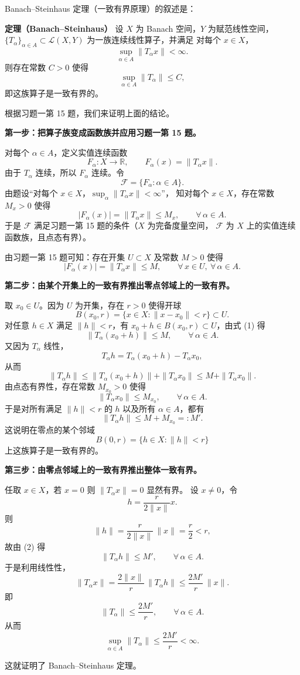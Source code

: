 \begin{solution}
Banach--Steinhaus 定理（一致有界原理）的叙述是：

\medskip
\noindent
\textbf{定理（Banach--Steinhaus）}\;
设 $X$ 为 Banach 空间，$Y$ 为赋范线性空间，
$\{T_\alpha\}_{\alpha\in A}\subset \mathcal{L}(X,Y)$ 为一族连续线性算子，并满足
对每个 $x\in X$，
\[
\sup_{\alpha\in A}\|T_\alpha x\|<\infty.
\]
则存在常数 $C>0$ 使得
\[
\sup_{\alpha\in A}\|T_\alpha\|\le C,
\]
即这族算子是一致有界的。

\medskip

根据习题一第 15 题，我们来证明上面的结论。

\medskip
\noindent
\textbf{第一步：把算子族变成函数族并应用习题一第 15 题。}

对每个 $\alpha\in A$，定义实值连续函数
\[
F_\alpha:X\to \mathbb{R},\qquad F_\alpha(x)=\|T_\alpha x\|.
\]
由于 $T_\alpha$ 连续，所以 $F_\alpha$ 连续。令
\[
\mathcal{F}=\{F_\alpha:\alpha\in A\}.
\]
由题设“对每个 $x\in X$，$\sup_{\alpha}\|T_\alpha x\|<\infty$”，
知对每个 $x\in X$，存在常数 $M_x>0$ 使得
\[
|F_\alpha(x)|=\|T_\alpha x\|\le M_x,\qquad \forall\,\alpha\in A.
\]
于是 $\mathcal{F}$ 满足习题一第 15 题的条件（$X$ 为完备度量空间，
$\mathcal{F}$ 为 $X$ 上的实值连续函数族，且点态有界）。

由习题一第 15 题可知：存在开集 $U\subset X$ 及常数 $M>0$ 使得
\[
|F_\alpha(x)|=\|T_\alpha x\|\le M,\qquad \forall\,x\in U,\ \forall\,\alpha\in A. \tag{1}
\]

\medskip
\noindent
\textbf{第二步：由某个开集上的一致有界推出零点邻域上的一致有界。}

取 $x_0\in U$。因为 $U$ 为开集，存在 $r>0$ 使得开球
\[
B(x_0,r)=\{x\in X:\|x-x_0\|<r\}\subset U.
\]
对任意 $h\in X$ 满足 $\|h\|<r$，有 $x_0+h\in B(x_0,r)\subset U$，由式 (1) 得
\[
\|T_\alpha(x_0+h)\|\le M,\qquad \forall\,\alpha\in A.
\]
又因为 $T_\alpha$ 线性，
\[
T_\alpha h = T_\alpha(x_0+h)-T_\alpha x_0,
\]
从而
\[
\|T_\alpha h\|
\le \|T_\alpha(x_0+h)\|+\|T_\alpha x_0\|
\le M + \|T_\alpha x_0\|.
\]
由点态有界性，存在常数 $M_{x_0}>0$ 使得
\[
\|T_\alpha x_0\|\le M_{x_0},\qquad \forall\,\alpha\in A.
\]
于是对所有满足 $\|h\|<r$ 的 $h$ 以及所有 $\alpha\in A$，都有
\[
\|T_\alpha h\|\le M+M_{x_0}=:M'. \tag{2}
\]
这说明在零点的某个邻域
\[
B(0,r)=\{h\in X:\|h\|<r\}
\]
上这族算子是一致有界的。

\medskip
\noindent
\textbf{第三步：由零点邻域上的一致有界推出整体一致有界。}

任取 $x\in X$，若 $x=0$ 则 $\|T_\alpha x\|=0$ 显然有界。
设 $x\ne0$，令
\[
h=\frac{r}{2\|x\|}x.
\]
则
\[
\|h\|=\frac{r}{2\|x\|}\,\|x\|=\frac{r}{2}<r,
\]
故由 (2) 得
\[
\|T_\alpha h\|\le M',\qquad \forall\,\alpha\in A.
\]
于是利用线性性，
\[
\|T_\alpha x\|
=\frac{2\|x\|}{r}\,\|T_\alpha h\|
\le \frac{2M'}{r}\,\|x\|.
\]
即
\[
\|T_\alpha\|\le \frac{2M'}{r},\qquad \forall\,\alpha\in A.
\]
从而
\[
\sup_{\alpha\in A}\|T_\alpha\|\le \frac{2M'}{r}<\infty.
\]

这就证明了 Banach--Steinhaus 定理。

\end{solution}

